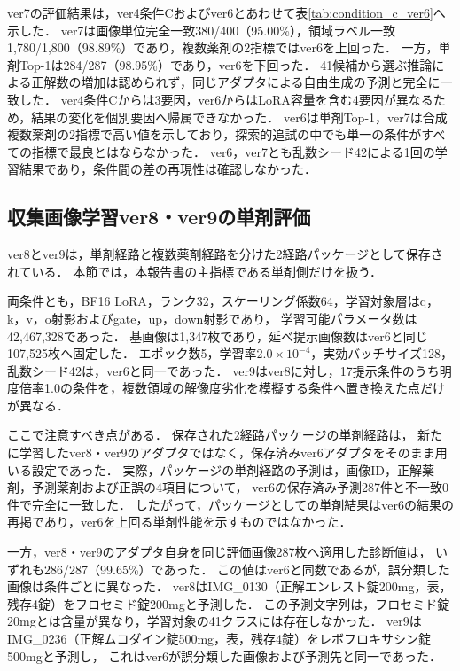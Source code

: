 \documentclass[uplatex,dvipdfmx]{jsarticle}
\begin{document}
ver7の評価結果は，ver4条件Cおよびver6とあわせて表\ref{tab:condition_c_ver6}へ示した．
ver7は画像単位完全一致380/400（95.00\%），領域ラベル一致1,780/1,800（98.89\%）であり，複数薬剤の2指標ではver6を上回った．
一方，単剤Top-1は284/287（98.95\%）であり，ver6を下回った．
41候補から選ぶ推論による正解数の増加は認められず，同じアダプタによる自由生成の予測と完全に一致した．
ver4条件Cからは3要因，ver6からはLoRA容量を含む4要因が異なるため，結果の変化を個別要因へ帰属できなかった．
ver6は単剤Top-1，ver7は合成複数薬剤の2指標で高い値を示しており，探索的追試の中でも単一の条件がすべての指標で最良とはならなかった．
ver6，ver7とも乱数シード42による1回の学習結果であり，条件間の差の再現性は確認しなかった．

\subsection{収集画像学習ver8・ver9の単剤評価}\label{sec:ver8_ver9_results}

ver8とver9は，単剤経路と複数薬剤経路を分けた2経路パッケージとして保存されている．
本節では，本報告書の主指標である単剤側だけを扱う．

両条件とも，BF16 LoRA，ランク32，スケーリング係数64，学習対象層はq，k，v，o射影およびgate，up，down射影であり，
学習可能パラメータ数は42,467,328であった．
基画像は1,347枚であり，延べ提示画像数はver6と同じ107,525枚へ固定した．
エポック数5，学習率$2.0\times10^{-4}$，実効バッチサイズ128，乱数シード42は，ver6と同一であった．
ver9はver8に対し，17提示条件のうち明度倍率1.0の条件を，複数領域の解像度劣化を模擬する条件へ置き換えた点だけが異なる．

ここで注意すべき点がある．
保存された2経路パッケージの単剤経路は，
新たに学習したver8・ver9のアダプタではなく，保存済みver6アダプタをそのまま用いる設定であった．
実際，パッケージの単剤経路の予測は，画像ID，正解薬剤，予測薬剤および正誤の4項目について，
ver6の保存済み予測287件と不一致0件で完全に一致した．
したがって，パッケージとしての単剤結果はver6の結果の再掲であり，ver6を上回る単剤性能を示すものではなかった．

一方，ver8・ver9のアダプタ自身を同じ評価画像287枚へ適用した診断値は，
いずれも286/287（99.65\%）であった．
この値はver6と同数であるが，誤分類した画像は条件ごとに異なった．
ver8はIMG\_0130（正解エンレスト錠200mg，表，残存4錠）をフロセミド錠200mgと予測した．
この予測文字列は，フロセミド錠20mgとは含量が異なり，学習対象の41クラスには存在しなかった．
ver9はIMG\_0236（正解ムコダイン錠500mg，表，残存4錠）をレボフロキサシン錠500mgと予測し，
これはver6が誤分類した画像および予測先と同一であった．
\end{document}
